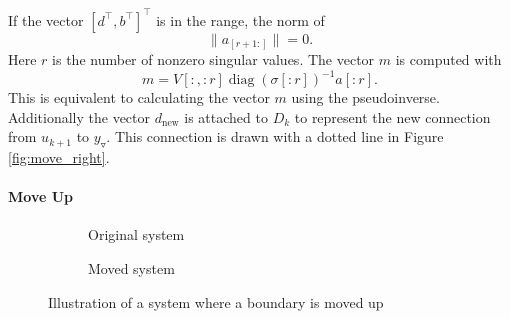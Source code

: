 \documentclass[doctype=mastersthesis,BCOR=15mm,biblatex]{ldvbook}%
\DeclareMathOperator{\diag}{diag}
\newcommand{\m}{\triangledown} %
\begin{document}
If the vector $[d^\top,b^\top]^\top$ is in the range, the norm of 
\begin{equation}
	\|a_{[r+1:]} \| = 0
	.
\end{equation}
Here $r$ is the number of nonzero singular values.
The vector $m$ is computed with 
\begin{equation}
	m = V[:,:r] \diag(\sigma[:r])^{-1} a[:r]
	.
\end{equation}
This is equivalent to calculating the vector $m$ using the pseudoinverse.  
Additionally the vector $d_\text{new}$ is attached to $D_k$ to represent the new connection from $u_{k+1}$ to $y_\m$.
This connection is drawn with a dotted line in Figure\,\ref{fig:move_right}.




\paragraph{Move Up}
\begin{figure}[!htb]
	\centering
	
	\begin{subfigure}[b]{0.45\textwidth}
		\caption{Original system}
		\label{fig:move_up_a}
	\end{subfigure}
	\hspace{0.8cm}
	\begin{subfigure}[b]{0.45\textwidth}
		\caption{Moved system}
		\label{fig:move_up_b}
	\end{subfigure}
	\caption{Illustration of a system where a boundary is moved up}
	\label{fig:move_up}
\end{figure}
\end{document}
